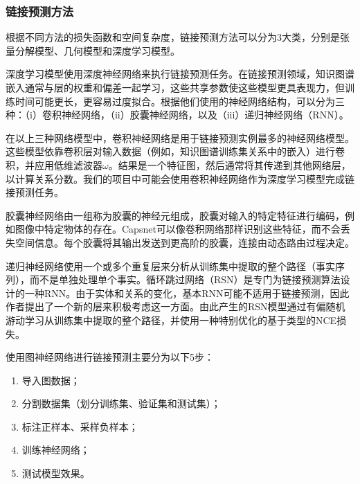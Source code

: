 \documentclass[twocolumn]{article}
\begin{document}
\subsubsection{链接预测方法}
根据不同方法的损失函数和空间复杂度，链接预测方法可以分为3大类，分别是张量分解模型、几何模型和深度学习模型\cite{link_prediction}。\par
深度学习模型使用深度神经网络来执行链接预测任务。在链接预测领域，知识图谱嵌入通常与层的权重和偏差一起学习，这些共享参数使这些模型更具表现力，但训练时间可能更长，更容易过度拟合。根据他们使用的神经网络结构，可以分为三种：（i）卷积神经网络，（ii）胶囊神经网络，以及（iii）递归神经网络（RNN）\cite{link_prediction}。\par
在以上三种网络模型中，卷积神经网络是用于链接预测实例最多的神经网络模型。这些模型依靠卷积层对输入数据（例如，知识图谱训练集关系中的嵌入）进行卷积，并应用低维滤波器$\omega$。结果是一个特征图，然后通常将其传递到其他网络层，以计算关系分数。我们的项目中可能会使用卷积神经网络作为深度学习模型完成链接预测任务。\par
胶囊神经网络由一组称为胶囊的神经元组成，胶囊对输入的特定特征进行编码，例如图像中特定物体的存在。Capsnet可以像卷积网络那样识别这些特征，而不会丢失空间信息。每个胶囊将其输出发送到更高阶的胶囊，连接由动态路由过程决定。\par
递归神经网络使用一个或多个重复层来分析从训练集中提取的整个路径（事实序列），而不是单独处理单个事实。循环跳过网络（RSN）是专门为链接预测算法设计的一种RNN。由于实体和关系的变化，基本RNN可能不适用于链接预测，因此作者提出了一个新的层来积极考虑这一方面。由此产生的RSN模型通过有偏随机游动学习从训练集中提取的整个路径，并使用一种特别优化的基于类型的NCE损失。\par
使用图神经网络进行链接预测主要分为以下5步：\par
\begin{enumerate}
	\item 导入图数据；
	\item 分割数据集（划分训练集、验证集和测试集）；
	\item 标注正样本、采样负样本；
	\item 训练神经网络；
	\item 测试模型效果。
\end{enumerate}\par
\end{document}
